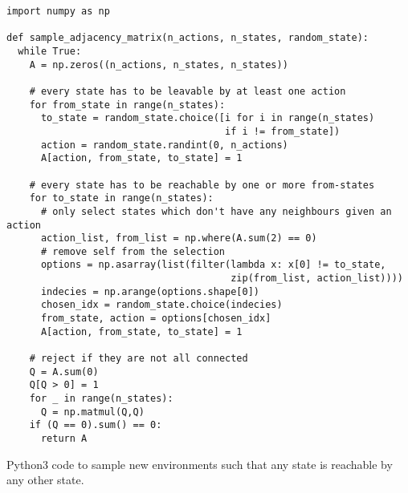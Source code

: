 \documentclass{article} \usepackage{iclr2021_conference,times}
\begin{document}
\begin{listing}[H]
\begin{verbatim}
import numpy as np
    
def sample_adjacency_matrix(n_actions, n_states, random_state):
  while True:
    A = np.zeros((n_actions, n_states, n_states))

    # every state has to be leavable by at least one action
    for from_state in range(n_states):
      to_state = random_state.choice([i for i in range(n_states)
                                      if i != from_state])
      action = random_state.randint(0, n_actions)
      A[action, from_state, to_state] = 1

    # every state has to be reachable by one or more from-states
    for to_state in range(n_states):
      # only select states which don't have any neighbours given an action
      action_list, from_list = np.where(A.sum(2) == 0)
      # remove self from the selection
      options = np.asarray(list(filter(lambda x: x[0] != to_state,
                                       zip(from_list, action_list))))
      indecies = np.arange(options.shape[0])
      chosen_idx = random_state.choice(indecies)
      from_state, action = options[chosen_idx]
      A[action, from_state, to_state] = 1

    # reject if they are not all connected
    Q = A.sum(0)
    Q[Q > 0] = 1
    for _ in range(n_states):
      Q = np.matmul(Q,Q)
    if (Q == 0).sum() == 0:
      return A
\end{verbatim}
\caption{Python3 code to sample new environments such that any state is reachable by any other state.}
\label{appendix:lst:genEnvs}
\end{listing}
\end{document}
